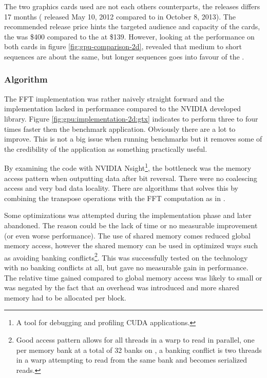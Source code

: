 The two graphics cards used are not each others counterparts, the releases differs 17 months ({\NVCARD} released May 10, 2012 compared to {\AMDCARD} in October 8, 2013). The recommended release price hints the targeted audience and capacity of the cards, the {\NVCARD} was \$400 compared to the {\AMDCARD} at \$139. However, looking at the {\OCL} performance on both cards in figure \ref{fig:gpu-comparison-2d}, revealed that medium to short sequences are about the same, but longer sequences goes into favour of the {\NVCARD}.

\subsubsection{Algorithm}

The FFT implementation was rather naively straight forward and the implementation lacked in performance compared to the NVIDIA developed {\CUFFT} library. Figure \ref{fig:gpu:implementation-2d:gtx} indicates {\CUFFT} to perform three to four times faster then the benchmark application. Obviously there are a lot to improve. This is not a big issue when running benchmarks but it removes some of the credibility of the application as something practically useful.

By examining the code with NVIDIA Nsight\footnote{A tool for debugging and profiling CUDA applications.}, the bottleneck was the memory access pattern when outputting data after bit reversal. There were no coalescing access and very bad data locality. There are algorithms that solves this by combining the transpose operations with the FFT computation as in \cite{govindaraju2008high}.

Some optimizations was attempted during the implementation phase and later abandoned. The reason could be the lack of time or no measurable improvement (or even worse performance). The use of shared memory comes reduced global memory access, however the shared memory can be used in optimized ways such as avoiding banking conflicts\footnote{Good access pattern allows for all threads in a warp to read in parallel, one per memory bank at a total of 32 banks on {\NVCARD}, a banking conflict is two threads in a warp attempting to read from the same bank and becomes serialized reads.}. This was successfully tested on the {\CU} technology with no banking conflicts at all, but gave no measurable gain in performance. The relative time gained compared to global memory access was likely to small or was negated by the fact that an overhead was introduced and more shared memory had to be allocated per block.

